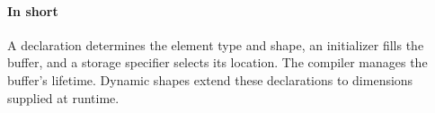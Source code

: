 \paragraph*{In short}

A declaration determines the element type and shape, an initializer fills the buffer, and a storage specifier selects its location. The compiler manages the buffer's lifetime. Dynamic shapes extend these declarations to dimensions supplied at runtime.
